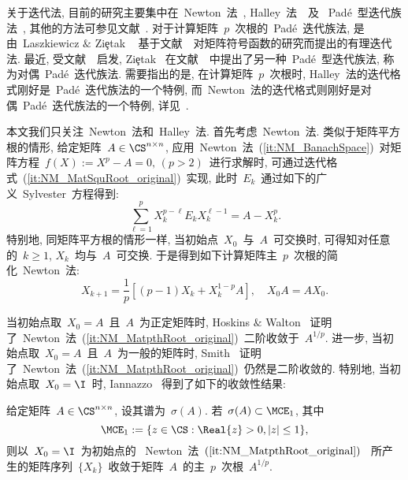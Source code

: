 关于迭代法,
目前的研究主要集中在~Newton~法~\cite{Iannazzo2006,Iannazzo2008,GuoHigham2006,Guo2010},
Halley~法~\cite{Iannazzo2008,Lin2010,Guo2010}~及
~Pad\'{e}~型迭代族法~\cite{Laszkiewicz2009,HighamLin2011,Cardoso2011,Cardoso2011a,Gomilko2012,Gomilko2012a,HighamLin2013,Zietak2013},
其他的方法可参见文献~\cite{Shieh1985,Tsay1986,Tsai1988,Lakic1998,BiniHighamMeini2005}.
对于计算矩阵~$p$~次根的~Pad\'{e}~迭代族法, 是由~Laszkiewicz $\&$
Zi\c{e}tak \cite{Laszkiewicz2009}~
基于文献~\cite{Kenney1991}~对矩阵符号函数的研究而提出的有理迭代法.
最近, 受文献~\cite{Greco2012}~启发, Zi\c{e}tak~
在文献~\cite{Zietak2013}~中提出了另一种~Pad\'{e}~型迭代族法,
称为对偶~Pad\'{e}~迭代族法. 需要指出的是, 在计算矩阵~$p$~次根时,
Halley~法的迭代格式刚好是~Pad\'{e}~迭代族法的一个特例,
而~Newton~法的迭代格式则刚好是对偶~Pad\'{e}~迭代族法的一个特例,
详见~\cite{Laszkiewicz2009,Zietak2013}.



本文我们只关注~Newton~法和~Halley~法. 首先考虑~Newton~法.
类似于矩阵平方根的情形, 给定矩阵~$A\in\CS^{n\times n}$,
应用~Newton~法~(\ref{it:NM_BanachSpace})~对矩阵方程~$f(X) := X^p-A =
0,\, (p>2)$~进行求解时,
可通过迭代格式~(\ref{it:NM_MatSquRoot_original})~实现,
此时~$E_k$~通过如下的广义~Sylvester~方程得到:
$$
\sum_{\ell=1}^p X_k^{p-\ell} E_k X_k^{\ell-1} = A - X_k^p.
$$
特别地, 同矩阵平方根的情形一样, 当初始点~$X_0$~与~$A$~可交换时,
可得知对任意的~$k\geq 1$, $X_k$~均与~$A$~可交换.
于是得到如下计算矩阵主~$p$~次根的简化~Newton~法:
\begin{equation}
\label{it:NM_MatpthRoot_original} X_{k+1} = \frac{1}{p}[(p - 1)X_k +
X_k^{1-p}A], \quad X_0A = AX_0.
\end{equation}

当初始点取~$X_0 = A$~且~$A$~为正定矩阵时, Hoskins $\&$
Walton~\cite{Hoskins1979}
证明了~Newton~法~(\ref{it:NM_MatpthRoot_original})~二阶收敛于~$A^{1/p}$.
进一步, 当初始点取~$X_0 = A$~且~$A$~为一般的矩阵时,
Smith~\cite{Smith2003}
证明了~Newton~法~(\ref{it:NM_MatpthRoot_original})~仍然是二阶收敛的.
特别地, 当初始点取~$X_0 = \I$~时, Iannazzo
\cite{Iannazzo2006}~得到了如下的收敛性结果:

\begin{theorem}
\label{th:Conv_NM_Ian2006} 给定矩阵~$A\in\CS^{n\times n}$,
设其谱为~$\sigma(A)$. 若~$\sigma(A) \subset \MCE_1$, 其中
\begin{equation}
\label{set:ConvReg_NM_Ian2006} \MCE_1 := \{z\in\CS: \Real{z}
>0, |z| \leq 1\},
\end{equation}
则以~$X_0 = \I$~为初始点的
~Newton~法~$(\ref{it:NM_MatpthRoot_original})$~
所产生的矩阵序列~$\{X_k\}$~收敛于矩阵~$A$~的主~$p$~次根~$A^{1/p}$.
\end{theorem}


